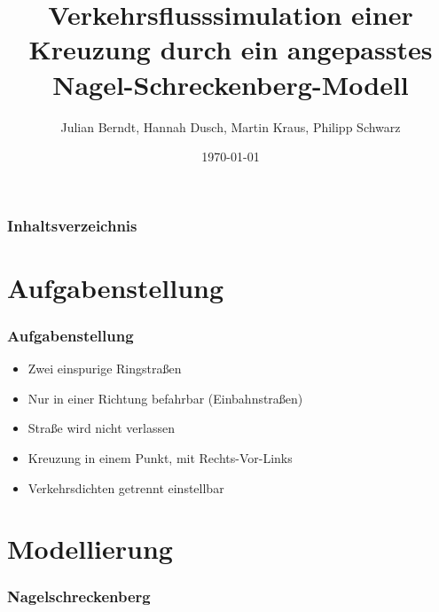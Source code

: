 \documentclass[hyperref={pdfpagelabels=false}, 12pt]{beamer}
\title{Verkehrsflusssimulation einer Kreuzung durch ein angepasstes Nagel-Schreckenberg-Modell }
\author{ Julian Berndt, Hannah Dusch, Martin Kraus, Philipp Schwarz}
\date{\today}
\begin{document}
{
\begin{titlepage}

\end{titlepage}

\begin{frame}
\frametitle{Inhaltsverzeichnis}
\tableofcontents
\end{frame} 

\section{Aufgabenstellung}
\begin{frame}
	\frametitle{Aufgabenstellung}
	\begin{itemize}
		\item Zwei einspurige Ringstraßen
		\item Nur in einer Richtung befahrbar (Einbahnstraßen)
		\item Straße wird nicht verlassen
		\item Kreuzung in einem Punkt, mit Rechts-Vor-Links
		\item Verkehrsdichten getrennt einstellbar
	\end{itemize}
\end{frame}

\section{Modellierung}
\begin{frame}
	\frametitle{Nagelschreckenberg}
	\begin{algorithm}[H]

 
 \label{algo:nagelsberg}
\end{algorithm}


\end{frame}}
\end{document}
